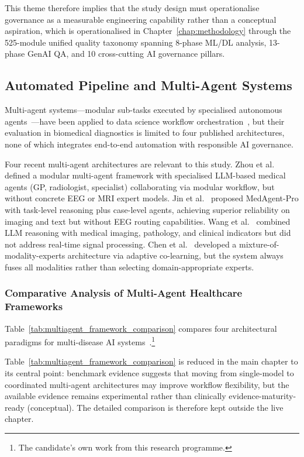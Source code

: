 \noindent This theme therefore implies that the study design must operationalise governance as a measurable engineering capability rather than a conceptual aspiration, which is operationalised in Chapter~\ref{chap:methodology} through the 525-module unified quality taxonomy spanning 8-phase ML/DL analysis, 13-phase GenAI QA, and 10 cross-cutting AI governance pillars.

\subsection{Automated Pipeline and Multi-Agent Systems}

Multi-agent systems---modular sub-tasks executed by specialised autonomous agents~\cite{wooldridge2009multiagent, russell2020ai}---have been applied to data science workflow orchestration~\cite{wang2024agentai}, but their evaluation in biomedical diagnostics is limited to four published architectures, none of which integrates end-to-end automation with responsible AI governance.

Four recent multi-agent architectures are relevant to this study. Zhou et al.~\cite{zhou2025mam} defined a modular multi-agent framework with specialised LLM-based medical agents (GP, radiologist, specialist) collaborating via modular workflow, but without concrete EEG or MRI expert models. Jin et al.~\cite{jin2025medagent} proposed MedAgent-Pro with task-level reasoning plus case-level agents, achieving superior reliability on imaging and text but without EEG routing capabilities. Wang et al.~\cite{wang2025llmagent} combined LLM reasoning with medical imaging, pathology, and clinical indicators but did not address real-time signal processing. Chen et al.~\cite{chen2025adacomed} developed a mixture-of-modality-experts architecture via adaptive co-learning, but the system always fuses all modalities rather than selecting domain-appropriate experts.


\subsubsection{Comparative Analysis of Multi-Agent Healthcare Frameworks}

Table~\ref{tab:multiagent_framework_comparison} compares four architectural paradigms for multi-disease AI systems~\cite{asthana2025eegmaster}.\footnote{The candidate's own work from this research programme.}

\label{tab:multiagent_framework_comparison}
Table~\ref{tab:multiagent_framework_comparison} is reduced in the main chapter to its central point: benchmark evidence suggests that moving from single-model to coordinated multi-agent architectures may improve workflow flexibility, but the available evidence remains experimental rather than clinically evidence-maturity-ready (conceptual). The detailed comparison is therefore kept outside the live chapter.

